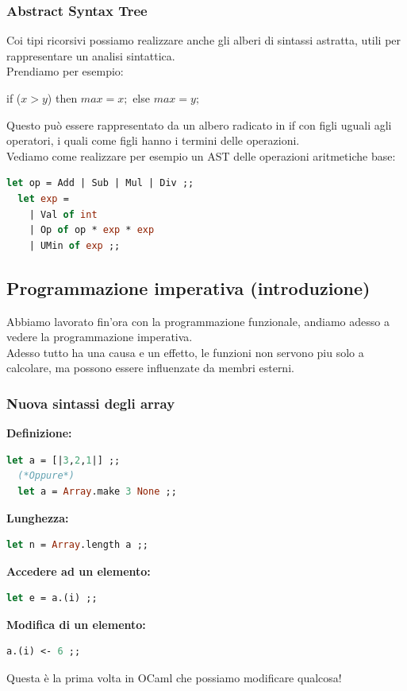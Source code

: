 \documentclass[12pt,a4paper]{article}
\begin{document}
\subsubsection{Abstract Syntax Tree}
Coi tipi ricorsivi possiamo realizzare anche gli alberi di sintassi astratta, utili per rappresentare un analisi sintattica.\\
Prendiamo per esempio:
\begin{center}
  if ($x > y$) then $max = x;$ else $max = y;$
\end{center}
Questo può essere rappresentato da un albero radicato in if con figli uguali agli operatori, i quali come figli hanno i termini delle operazioni.\\
Vediamo come realizzare per esempio un AST delle operazioni aritmetiche base:
\begin{lstlisting}[language=OCaml]
  let op = Add | Sub | Mul | Div ;;
  let exp = 
    | Val of int
    | Op of op * exp * exp
    | UMin of exp ;;
\end{lstlisting}

\subsection{Programmazione imperativa (introduzione)}
Abbiamo lavorato fin'ora con la programmazione funzionale, andiamo adesso a vedere la programmazione imperativa.\\
Adesso tutto ha una causa e un effetto, le funzioni non servono piu solo a calcolare, ma possono essere influenzate da membri esterni.
\subsubsection{Nuova sintassi degli array}
\textbf{Definizione:}
\begin{lstlisting}[language=OCaml]
  let a = [|3,2,1|] ;;
  (*Oppure*)
  let a = Array.make 3 None ;;
\end{lstlisting}
\textbf{Lunghezza:}
\begin{lstlisting}[language=OCaml]
  let n = Array.length a ;;
\end{lstlisting}
\textbf{Accedere ad un elemento:}
\begin{lstlisting}[language=OCaml]
  let e = a.(i) ;;
\end{lstlisting}
\textbf{Modifica di un elemento:}
\begin{lstlisting}[language=OCaml]
  a.(i) <- 6 ;;
\end{lstlisting}
Questa è la prima volta in OCaml che possiamo modificare qualcosa!
\end{document}
